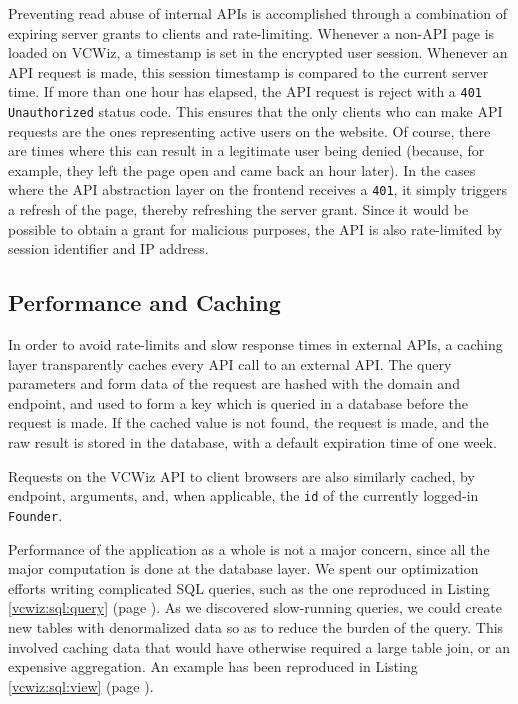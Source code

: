 Preventing read abuse of internal APIs is accomplished through a combination of expiring server grants to clients and rate-limiting. Whenever a non-API page is loaded on VCWiz, a timestamp is set in the encrypted user session. Whenever an API request is made, this session timestamp is compared to the current server time. If more than one hour has elapsed, the API request is reject with a \texttt{401 Unauthorized} status code. This ensures that the only clients who can make API requests are the ones representing active users on the website. Of course, there are times where this can result in a legitimate user being denied (because, for example, they left the page open and came back an hour later). In the cases where the API abstraction layer on the frontend receives a \texttt{401}, it simply triggers a refresh of the page, thereby refreshing the server grant. Since it would be possible to obtain a grant for malicious purposes, the API is also rate-limited by session identifier and IP address.

\subsection{Performance and Caching}

In order to avoid rate-limits and slow response times in external APIs, a caching layer transparently caches every API call to an external API. The query parameters and form data of the request are hashed with the domain and endpoint, and used to form a key which is queried in a database before the request is made. If the cached value is not found, the request is made, and the raw result is stored in the database, with a default expiration time of one week.

Requests on the VCWiz API to client browsers are also similarly cached, by endpoint, arguments, and, when applicable, the \texttt{id} of the currently logged-in \texttt{Founder}.

Performance of the application as a whole is not a major concern, since all the major computation is done at the database layer. We spent our optimization efforts writing complicated SQL queries, such as the one reproduced in Listing \ref{vcwiz:sql:query} (page \pageref{vcwiz:sql:query}). As we discovered slow-running queries, we could create new tables with denormalized data so as to reduce the burden of the query. This involved caching data that would have otherwise required a large table join, or an expensive aggregation. An example has been reproduced in Listing \ref{vcwiz:sql:view} (page \pageref{vcwiz:sql:view}).

